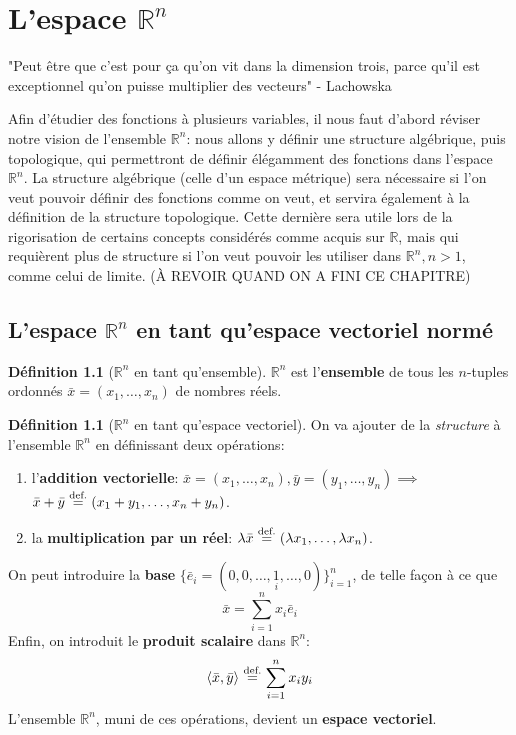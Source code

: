 \documentclass{report}
\theoremstyle{plain}
\theoremstyle{definition}
\newtheorem{defn}[thm]{Définition}
\theoremstyle{remark}
\newcommand*\eqdef{\; \stackrel{ \mathclap{ \normalfont\text{def.} } }{ = } \;} %
\begin{document}
\chapter{L'espace $\mathbb R^n$}

\begin{center}
"Peut être que c'est pour ça qu'on vit dans la dimension trois, parce qu'il est exceptionnel qu'on puisse multiplier des vecteurs" - Lachowska
\end{center}

Afin d'étudier des fonctions à plusieurs variables, il nous faut d'abord réviser notre vision de l'ensemble $\mathbb R^n$: nous allons y définir une structure algébrique, puis topologique, qui permettront de définir élégamment des fonctions dans l'espace $\mathbb R^n$. La structure algébrique (celle d'un espace métrique) sera nécessaire si l'on veut pouvoir définir des fonctions comme on veut, et servira également à la définition de la structure topologique. Cette dernière sera utile lors de la rigorisation de certains concepts considérés comme acquis sur $\mathbb R$, mais qui requièrent plus de structure si l'on veut pouvoir les utiliser dans $\mathbb R^n, n > 1$, comme celui de limite. (À REVOIR QUAND ON A FINI CE CHAPITRE)

\section{L'espace $\mathbb R^n$ en tant qu'espace vectoriel normé}
\begin{defn}[$\mathbb R^n$ en tant qu'ensemble]
	$\mathbb R^n$ est l'\textbf{ensemble} de tous les $n$-tuples ordonnés $\bar x = (x_1, \ldots, x_n)$ de nombres réels. 
\end{defn}

\begin{defn}[$\mathbb R^n$ en tant qu'espace vectoriel]
	On va ajouter de la \emph{structure} à l'ensemble $\mathbb R^n$ en définissant deux opérations:
	\begin{enumerate}
		\item l'\textbf{addition vectorielle}: $\bar x = (x_1, \ldots, x_n), \bar y = (y_1, \ldots, y_n) \implies$ \\ $\bar x + \bar y \eqdef (x_1 + y_1, \ldots, x_n + y_n)$.
		\item la \textbf{multiplication par un réel}: $\lambda \bar x \eqdef (\lambda x_1, \ldots, \lambda x_n)$.
	\end{enumerate}
	On peut introduire la \textbf{base} $\{\bar e_i = (0, 0, \ldots, \underset{i}{1}, \ldots, 0)\}_{i=1}^n$, de telle façon à ce que
	\begin{equation}
		\bar x = \sum_{i=1}^n x_i \bar e_i
	\end{equation}
	Enfin, on introduit le \textbf{produit scalaire} dans $\mathbb R^n$:
	\begin{equation}
		\langle \bar x, \bar y \rangle \eqdef \sum_{i=1}^n x_i y_i
	\end{equation}
	L'ensemble $\mathbb R^n$, muni de ces opérations, devient un \textbf{espace vectoriel}.
\end{defn}
\end{document}
